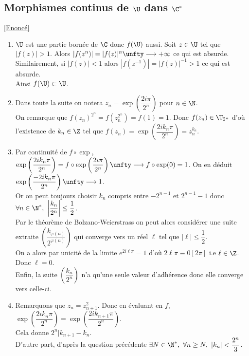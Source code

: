 \documentclass[8pt]{book}
\begin{document}
	\subsection{Morphismes continus de $\U$ dans $\C^*$ }
	\label{Morphismes continus de U dans C* corrigé}
	\textcolor{blue}{\hyperref[Morphismes continus de U dans C*]{[Enoncé]}}\\
	\begin{enumerate}[leftmargin=*]
		\item $\U$ est une partie bornée de $\C$ donc $f(\U)$ aussi. Soit $z\in \U$ tel que $|f(z)|>1$. Alors $|f(z^n)|=|f(z)|^n\unfty\longrightarrow+\infty$ ce qui est absurde. Similairement, si $|f(z)|<1$ alors $|f(z^{-1})|=|f(z)|^{-1}>1$ ce qui est absurde.\\
		Ainsi $f(\U)\subset \U$.
		\item Dans toute la suite on notera $z_n=\exp\left(\dfrac{2i\pi}{2^n}\right)$ pour $n\in \N$.\\
		On remarque que $f(z_n)^{2^n}=f(z_n^{2^n})=f(1)=1$. Donc $f(z_n)\in \U_{2^n}$ d'où l'existence de $k_n\in \Z$ tel que $f(z_n)=\exp\left(\dfrac{2ik_n\pi}{2^n}\right)=z_n^{k_n}$.
		\item Par continuité de $f\circ\exp$, $\exp\left(\dfrac{2ik_n\pi}{2^n}\right)=f\circ\exp\left(\dfrac{2i\pi}{2^n}\right)\unfty\longrightarrow f\circ\exp(0)=1$. On en déduit $\exp\left(\dfrac{-2ik_n\pi}{2^n}\right)\unfty\longrightarrow 1$.\\
		Or on peut toujours choisir $k_n$ compris entre $-2^{n-1}$ et $2^{n-1}-1$ donc $\forall n\in \N^*,\ \left|\dfrac{k_n}{2^n}\right|\leq \dfrac{1}{2}$.\\
		Par le théorème de Bolzano-Weierstrass on peut alors considérer une suite extraite $\left(\dfrac{k_{\varphi(n)}}{2^{\varphi(n)}}\right)$ qui converge vers un réel $\ell$ tel que $|\ell|\leq\dfrac{1}{2}$.\\
		On a alors par unicité de la limite $e^{2i\ell\pi}=1$ d'où $2\ell\pi\equiv 0[2\pi]$ i.e $\ell\in \Z$. Donc $\ell=0$.\\
		Enfin, la suite $\left(\dfrac{k_n}{2^n}\right)$ n'a qu'une seule valeur d'adhérence donc elle converge vers celle-ci.
		\item Remarquons que $z_n=z_{n+1}^2$. Donc en évaluant en $f$, $\exp\left(\dfrac{2ik_n\pi}{2^n}\right)=\exp\left(\dfrac{2ik_{n+1}\pi}{2^n}\right)$.\\
		Cela donne $2^n|k_{n+1}-k_n$.\\
		D'autre part, d'après la question précédente $\exists N\in \N^*,\ \forall n\geq N,\ |k_n|<\dfrac{2^n}{3}$.\\

\end{enumerate}
\end{document}
